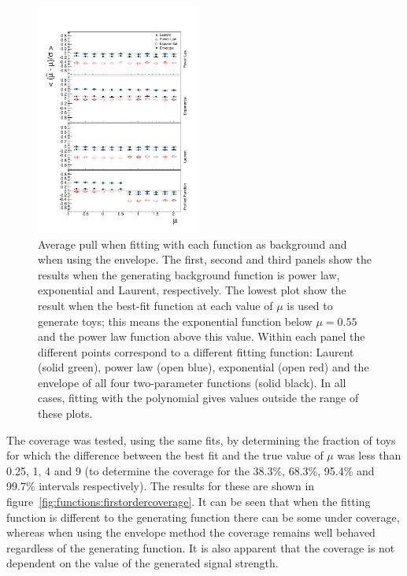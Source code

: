 \begin{figure}[tbp]
\centering
\includegraphics[width=0.48\textwidth]{functions/FirstOrderFunctions.pdf}
\caption{Average pull when fitting with each function as background and when
using the envelope. The first, second and third panels show the results
when the generating background function is power law, exponential and Laurent,
respectively. The lowest plot show the result when the best-fit function at each
value of $\mu$ is used to generate toys; this means the exponential function
below $\mu = 0.55$ and the power law function above this value. Within each panel the different
points correspond to a different fitting function: Laurent (solid green), power law (open blue), exponential (open red) and the envelope of all four two-parameter functions (solid black). In all cases,
fitting with the polynomial gives values outside the range of these plots.}
\label{fig:functions:firstorderbias}
\end{figure}

The coverage was tested, using the same fits, by determining the fraction of toys for which the \nll difference between the best fit and the true value of $\mu$ was less than 0.25, 1, 4 and 9 (to determine the coverage for the 38.3\%, 68.3\%, 95.4\% and 99.7\% intervals respectively). The results for these are shown in figure~\ref{fig:functions:firstordercoverage}. It can be seen that when the fitting function is different to the generating function there can be some under coverage, whereas when using the envelope method the coverage remains well behaved regardless of the generating function. It is also apparent that the coverage is not dependent on the value of the generated signal strength.

